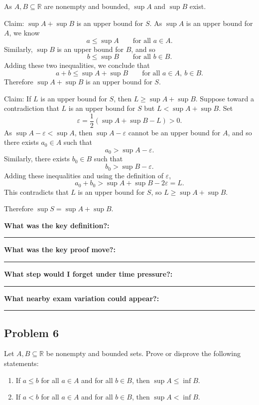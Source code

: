 \documentclass[12pt]{article}
\newcommand{\R}{\mathbb{R}}
\newcommand{\writespace}[1]{\vspace*{#1}}
\newcommand{\fillfieldbig}[2]{%
  \par\noindent\textbf{#1:}\par
  \writespace{#2}
  \noindent\rule{\linewidth}{0.35pt}\par\vspace{0.15in}%
}
\newenvironment{problemstatementbox}[1]{%
  \begin{tcolorbox}[
    enhanced,
    breakable,
    colback=probblue,
    colframe=blue!55!black,
    fonttitle=\bfseries,
    title={Problem Statement\hfill #1}
  ]
}{%
  \end{tcolorbox}
}
\newenvironment{solutionbox}[1]{%
  \begin{tcolorbox}[
    enhanced,
    breakable,
    colback=solgreen,
    colframe=green!45!black,
    fonttitle=\bfseries,
    title={#1}
  ]
}{%
  \end{tcolorbox}
}
\newcommand{\reflectionpage}[1]{%
  \begin{tcolorbox}[
    enhanced,
    colback=reflectcyan,
    colframe=cyan!55!black,
    fonttitle=\bfseries,
    title={Reflection \& Variation\hfill #1},
    height=8.45in
  ]
  \fillfieldbig{What was the key definition?}{1.15in}
  \fillfieldbig{What was the key proof move?}{1.15in}
  \fillfieldbig{What step would I forget under time pressure?}{1.15in}
  \fillfieldbig{What nearby exam variation could appear?}{1.35in}
  \end{tcolorbox}
}
\begin{document}
\newpage
\begin{solutionbox}{Official Solution (Professor)}
As \(A,B\subseteq\R\) are nonempty and bounded, \(\sup A\) and \(\sup B\) exist.

Claim: \(\sup A+\sup B\) is an upper bound for \(S\). As \(\sup A\) is an upper bound for \(A\), we know
\[
  a\le\sup A \qquad \text{for all }a\in A.
\]
Similarly, \(\sup B\) is an upper bound for \(B\), and so
\[
  b\le\sup B \qquad \text{for all }b\in B.
\]
Adding these two inequalities, we conclude that
\[
  a+b\le\sup A+\sup B
  \qquad \text{for all }a\in A,\ b\in B.
\]
Therefore \(\sup A+\sup B\) is an upper bound for \(S\).

Claim: If \(L\) is an upper bound for \(S\), then \(L\ge\sup A+\sup B\). Suppose toward a contradiction that \(L\) is an upper bound for \(S\) but \(L<\sup A+\sup B\). Set
\[
  \varepsilon=\frac12(\sup A+\sup B-L)>0.
\]
As \(\sup A-\varepsilon<\sup A\), then \(\sup A-\varepsilon\) cannot be an upper bound for \(A\), and so there exists \(a_0\in A\) such that
\[
  a_0>\sup A-\varepsilon.
\]
Similarly, there exists \(b_0\in B\) such that
\[
  b_0>\sup B-\varepsilon.
\]
Adding these inequalities and using the definition of \(\varepsilon\),
\[
  a_0+b_0>\sup A+\sup B-2\varepsilon=L.
\]
This contradicts that \(L\) is an upper bound for \(S\), so \(L\ge\sup A+\sup B\).

Therefore \(\sup S=\sup A+\sup B\).
\end{solutionbox}

\newpage
\reflectionpage{Homework 3, Problem 5}

\newpage
\subsection{Problem 6}

\begin{problemstatementbox}{Homework 3, Problem 6}
Let \(A,B\subseteq\R\) be nonempty and bounded sets. Prove or disprove the following statements:
\begin{enumerate}[label=(\alph*)]
  \item If \(a\le b\) for all \(a\in A\) and for all \(b\in B\), then \(\sup A\le\inf B\).
  \item If \(a<b\) for all \(a\in A\) and for all \(b\in B\), then \(\sup A<\inf B\).
\end{enumerate}
\end{problemstatementbox}
\end{document}
